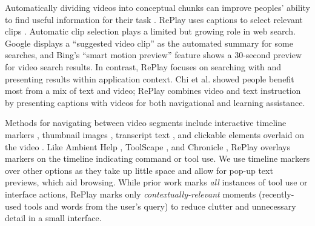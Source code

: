 Automatically dividing videos into conceptual chunks can improve peoples' ability to find useful information for their task \cite{Pongnumkul2011, Chi2012, Banovic2012, Nguyen2015, Grossman2010a, Matejka2011}. RePlay uses captions to select relevant clips \cite{Pavel2014, Pavel2015, Girgensohn2005}. Automatic clip selection plays a limited but growing role in web search. Google displays a ``suggested video clip'' \cite{Sullivan2018} as the automated summary for some searches, and Bing's ``smart motion preview'' feature \cite{Bing} shows a 30-second preview for video search results. In contrast, RePlay focuses on searching with and presenting results within application context. Chi et al. \cite{Chi2012} showed people benefit most from a mix of text and video; RePlay combines video and text instruction by presenting captions with videos for both navigational and learning assistance.

Methods for navigating between video segments include interactive timeline markers \cite{Matejka2011, Grossman2010, Kim2014, Banovic2012, Kim2014a}, thumbnail images \cite{Kim2014a, Pongnumkul2011, Banovic2012, Grossman2010a, Chi2012, Pavel2014}, transcript text \cite{Kim2014a}, and clickable elements overlaid on the video \cite{Nguyen2015}. Like Ambient Help \cite{Matejka2011}, ToolScape \cite{Kim2014}, and Chronicle \cite{Grossman2010}, RePlay overlays markers on the timeline indicating command or tool use. We use timeline markers over other options as they take up little space and allow for pop-up text previews, which aid browsing. While prior work marks \textit{all} instances of tool use or interface actions, RePlay marks only \textit{contextually-relevant} moments (recently-used tools and words from the user's query) to reduce clutter and unnecessary detail in a small interface.



